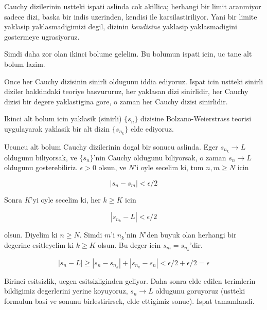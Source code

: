 \documentclass[12pt,fleqn]{article}
\begin{document}
Cauchy dizilerinin ustteki ispati aslinda cok akillica; herhangi bir limit
aranmiyor sadece dizi, baska bir indis uzerinden, kendisi ile
karsilastiriliyor. Yani bir limite yaklasip yaklasmadigimizi degil, dizinin
{\em kendisine} yaklasip yaklasmadigini gostermeye ugrasiyoruz. 

Simdi daha zor olan ikinci bolume gelelim. Bu bolumun ispati icin, uc
tane alt bolum lazim. 

Once her Cauchy dizisinin sinirli oldugunu iddia ediyoruz. Ispat icin
ustteki sinirli diziler hakkindaki teoriye basvururuz, her yaklasan dizi
sinirlidir, her Cauchy dizisi bir degere yaklastigina gore, o zaman her
Cauchy dizisi sinirlidir.

Ikinci alt bolum icin yaklasik (sinirli) $\{s_n\}$ dizisine Bolzano-Weierstrass
teorisi uygulayarak yaklasik bir alt dizin $\{s_{n_k}\}$ elde ediyoruz. 

Ucuncu alt bolum Cauchy dizilerinin dogal bir sonucu aslinda. Eger
 $s_{n_k}
\to L$ oldugunu biliyorsak, ve $\{s_n\}$'nin Cauchy oldugunu biliyorsak, o
zaman $s_n \to L$ oldugunu gosterebiliriz. $\epsilon > 0$ olsun, ve $N$'i
oyle secelim ki, tum $n,m \ge N$ icin

\[ |s_n - s_m| < \epsilon/2 \]

Sonra $K$'yi oyle secelim ki, her $k \ge K$ icin

\[ |s_{n_k} - L| < \epsilon/2 \]

olsun. Diyelim ki $n \ge N$. Simdi $m$'i $n_k$'nin $N$'den buyuk olan herhangi
bir degerine esitleyelim ki $k \ge K$ olsun. Bu deger icin $s_m =
s_{n_k}$'dir. 

\[ |s_n - L| \ge |s_n - s_{n_k}| + |s_{n_k} - s_n| < 
\epsilon/2 + \epsilon/2 = \epsilon 
\]

Birinci esitsizlik, ucgen esitsizliginden geliyor. Daha sonra elde edilen
terimlerin bildigimiz degerlerini yerine koyuyoruz, $s_n \to L$ oldugunu
goruyoruz (ustteki formulun basi ve sonunu birlestirirsek, elde ettigimiz
sonuc). Ispat tamamlandi. 
\end{document}
